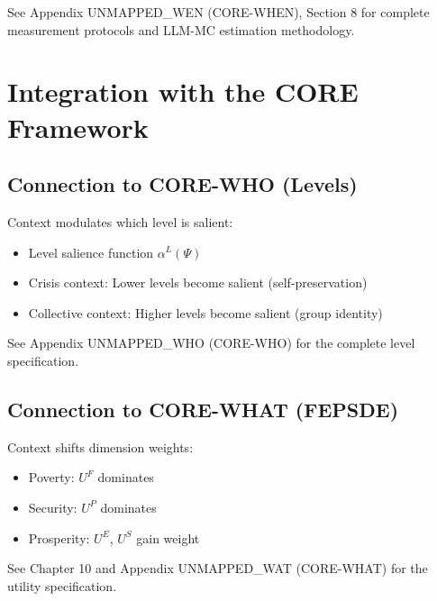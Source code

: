 \begin{cross-reference}
See Appendix UNMAPPED_WEN (CORE-WHEN), Section 8 for complete measurement protocols
and LLM-MC estimation methodology.
\end{cross-reference}



\section{Integration with the CORE Framework}
\label{sec:context-integration}


\subsection{Connection to CORE-WHO (Levels)}

\begin{cross-reference}
Context modulates which level is salient:
\begin{itemize}[nosep]
  \item Level salience function $\alpha^L(\Psi)$
  \item Crisis context: Lower levels become salient (self-preservation)
  \item Collective context: Higher levels become salient (group identity)
\end{itemize}
See Appendix UNMAPPED_WHO (CORE-WHO) for the complete level specification.
\end{cross-reference}

\subsection{Connection to CORE-WHAT (FEPSDE)}

\begin{cross-reference}
Context shifts dimension weights:
\begin{itemize}[nosep]
  \item Poverty: $U^F$ dominates
  \item Security: $U^P$ dominates
  \item Prosperity: $U^E$, $U^S$ gain weight
\end{itemize}
See Chapter 10 and Appendix UNMAPPED_WAT (CORE-WHAT) for the utility specification.
\end{cross-reference}

